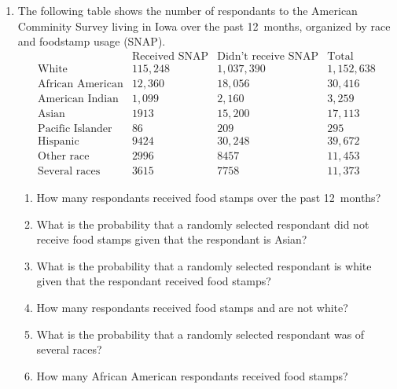 \documentclass[12pt]{article}
\begin{document}
\begin{enumerate}
\item The following table shows the number
of respondants to the American Comminity
Survey living in Iowa over the past 12~months, 
organized by race and foodstamp usage (SNAP).
\[\begin{array}{l|rr|r}
&\text{Received SNAP}&\text{Didn't receive SNAP}
&\text{Total}\\\hline
\text{White}&115,248&1,037,390&1,152,638\\
\text{African American}&12,360&18,056&30,416\\
\text{American Indian}&1,099&2,160&3,259\\
\text{Asian}&1913&15,200&17,113\\
\text{Pacific Islander}&86&209&295\\
\text{Hispanic}&9424&30,248&39,672\\
\text{Other race}&2996&8457&11,453\\
\text{Several races}&3615&7758&11,373
\end{array}\]
\begin{enumerate}
\item How many respondants received food stamps over the
past 12~months?
\item What is the probability that a randomly selected
respondant did not receive food stamps given that
the respondant is Asian?
\item What is the probability that a randomly selected
respondant is white given that the respondant
received food stamps?
\item How many respondants received food stamps and
are not white?
\item What is the probability that a randomly selected
respondant was of several races?
\item How many African American respondants received
food stamps?
\end{enumerate}


\end{enumerate}
\end{document}
